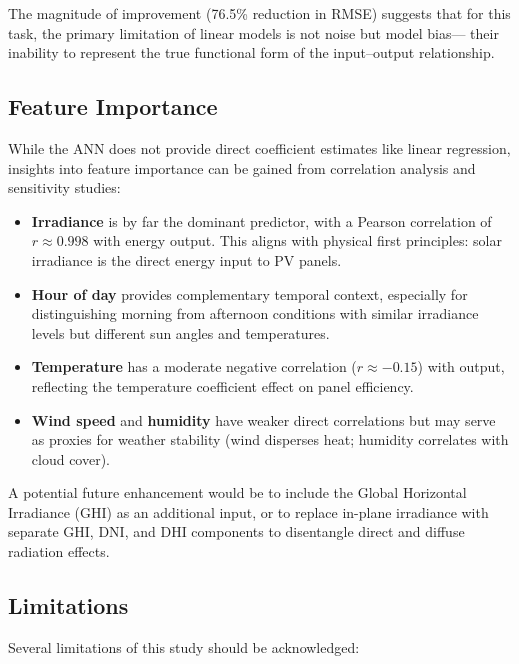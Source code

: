 \documentclass[11pt, a4paper]{article}
\begin{document}
The magnitude of improvement (76.5\% reduction in RMSE) suggests that for this
task, the primary limitation of linear models is not noise but model bias---
their inability to represent the true functional form of the input--output
relationship.

\subsection{Feature Importance}

While the ANN does not provide direct coefficient estimates like linear
regression, insights into feature importance can be gained from correlation
analysis and sensitivity studies:

\begin{itemize}
    \item \textbf{Irradiance} is by far the dominant predictor, with a Pearson
correlation of $r \approx 0.998$ with energy output. This aligns with physical
first principles: solar irradiance is the direct energy input to PV panels.
    \item \textbf{Hour of day} provides complementary temporal context,
especially for distinguishing morning from afternoon conditions with similar
irradiance levels but different sun angles and temperatures.
    \item \textbf{Temperature} has a moderate negative correlation ($r \approx -0.15$)
with output, reflecting the temperature coefficient effect on panel efficiency.
    \item \textbf{Wind speed} and \textbf{humidity} have weaker direct
correlations but may serve as proxies for weather stability (wind disperses
heat; humidity correlates with cloud cover).
\end{itemize}

A potential future enhancement would be to include the Global Horizontal
Irradiance (GHI) as an additional input, or to replace in-plane irradiance
with separate GHI, DNI, and DHI components to disentangle direct and diffuse
radiation effects.

\subsection{Limitations}

Several limitations of this study should be acknowledged:
\end{document}
